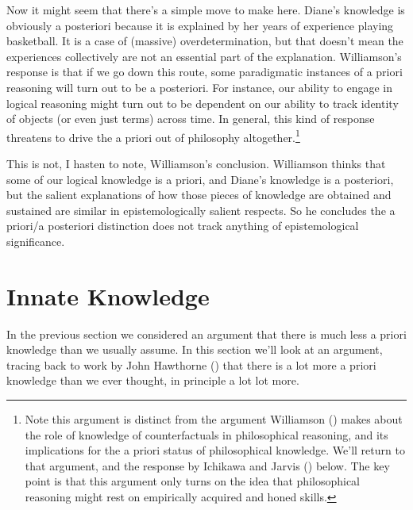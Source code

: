 \documentclass[
  11pt,
  letterpaper,
  DIV=11,
  numbers=noendperiod,
  twoside]{scrartcl}
\begin{document}
Now it might seem that there's a simple move to make here. Diane's
knowledge is obviously a posteriori because it is explained by her years
of experience playing basketball. It is a case of (massive)
overdetermination, but that doesn't mean the experiences collectively
are not an essential part of the explanation. Williamson's response is
that if we go down this route, some paradigmatic instances of a priori
reasoning will turn out to be a posteriori. For instance, our ability to
engage in logical reasoning might turn out to be dependent on our
ability to track identity of objects (or even just terms) across time.
In general, this kind of response threatens to drive the a priori out of
philosophy altogether.\footnote{Note this argument is distinct from the
  argument Williamson ()
  makes about the role of knowledge of counterfactuals in philosophical
  reasoning, and its implications for the a priori status of
  philosophical knowledge. We'll return to that argument, and the
  response by Ichikawa and Jarvis
  () below. The key point is that
  this argument only turns on the idea that philosophical reasoning
  might rest on empirically acquired and honed skills.}

This is not, I hasten to note, Williamson's conclusion. Williamson
thinks that some of our logical knowledge is a priori, and Diane's
knowledge is a posteriori, but the salient explanations of how those
pieces of knowledge are obtained and sustained are similar in
epistemologically salient respects. So he concludes the a priori/a
posteriori distinction does not track anything of epistemological
significance.

\section{Innate Knowledge}\label{innateknowledge}

In the previous section we considered an argument that there is much
less a priori knowledge than we usually assume. In this section we'll
look at an argument, tracing back to work by John Hawthorne
() that there is a lot more a priori
knowledge than we ever thought, in principle a lot lot more.
\end{document}
